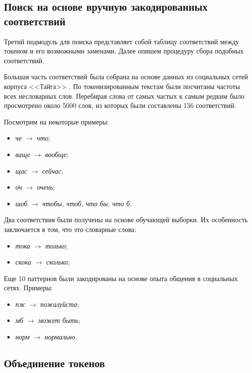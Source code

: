 \subsection{Поиск на основе вручную закодированных соответствий}

Третий подмодуль для поиска представляет собой таблицу соответствий между токеном и его возможными заменами. Далее опишем процедуру сбора подобных соответствий.

Большая часть соответствий была собрана на основе данных из социальных сетей корпуса <<Тайга>> \cite{Shavrina2017}.  По токенизированным текстам были посчитаны частоты всех несловарных слов. Перебирая слова от самых частых к самым редким было просмотрено около 5000 слов, из которых были составлены 136 соответствий.

Посмотрим на некоторые примеры:
\begin{itemize}
	\item \textit{че} $\rightarrow$ \textit{что};
	\item \textit{ваще} $\rightarrow$ \textit{вообще};
	\item \textit{щас} $\rightarrow$ \textit{сейчас};
	\item \textit{оч} $\rightarrow$ \textit{очень};
	\item \textit{шоб} $\rightarrow$ \textit{чтобы, чтоб, что бы, что б}.
\end{itemize}

Два соответствия были получены на основе обучающей выборки. Их особенность заключается в том, что это словарные слова:
\begin{itemize}
	\item \textit{тока} $\rightarrow$ \textit{только};
	\item \textit{скока} $\rightarrow$ \textit{сколько};
\end{itemize}

Еще 10 паттернов были закодированы на основе опыта общения в социальных сетях. Примеры:
\begin{itemize}
	\item \textit{пж} $\rightarrow$ \textit{пожалуйста};
	\item \textit{мб} $\rightarrow$ \textit{может быть};
	\item \textit{норм} $\rightarrow$ \textit{нормально}.
\end{itemize}

\subsection{Объединение токенов}

